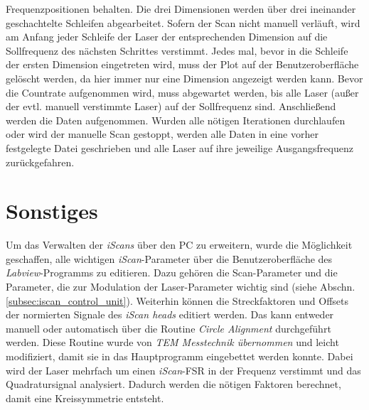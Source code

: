Frequenzpositionen behalten.
Die drei Dimensionen werden über drei ineinander geschachtelte Schleifen abgearbeitet. Sofern der Scan nicht
manuell verläuft, wird am Anfang jeder Schleife der Laser der entsprechenden
Dimension auf die Sollfrequenz des nächsten Schrittes verstimmt. Jedes mal, bevor in die Schleife
der ersten Dimension eingetreten wird, muss der Plot auf der Benutzeroberfläche
gelöscht werden, da hier immer nur eine Dimension angezeigt werden kann. Bevor
die Countrate aufgenommen wird, muss abgewartet werden, bis alle Laser (außer
der evtl. manuell verstimmte Laser) auf der Sollfrequenz sind.
Anschließend werden die Daten aufgenommen. Wurden alle nötigen Iterationen
durchlaufen oder wird der manuelle Scan gestoppt, werden alle Daten in eine
vorher festgelegte Datei geschrieben und alle Laser auf ihre
jeweilige Ausgangsfrequenz zurückgefahren.

\section{Sonstiges}\label{sec:sonstiges}
Um das Verwalten der \textit{iScans} über den PC zu erweitern, wurde die
Möglichkeit geschaffen, alle wichtigen \textit{iScan}-Parameter über die
Benutzeroberfläche des \textit{Labview}-Programms zu editieren. Dazu gehören
die Scan-Parameter und die Parameter, die zur Modulation der
Laser-Parameter wichtig sind (siehe Abschn. \ref{subsec:iscan_control_unit}).
Weiterhin können die Streckfaktoren und Offsets der normierten Signale des
\textit{iScan heads} editiert werden. Das kann entweder manuell
oder automatisch über die Routine \textit{Circle Alignment} durchgeführt
werden. Diese Routine wurde von \textit{TEM Messtechnik übernommen} und leicht
modifiziert, damit sie in das Hauptprogramm eingebettet werden konnte. Dabei
wird der Laser mehrfach um einen \textit{iScan}-FSR in der Frequenz verstimmt
und das Quadratursignal analysiert. Dadurch werden die nötigen Faktoren
berechnet, damit eine Kreissymmetrie entsteht.

